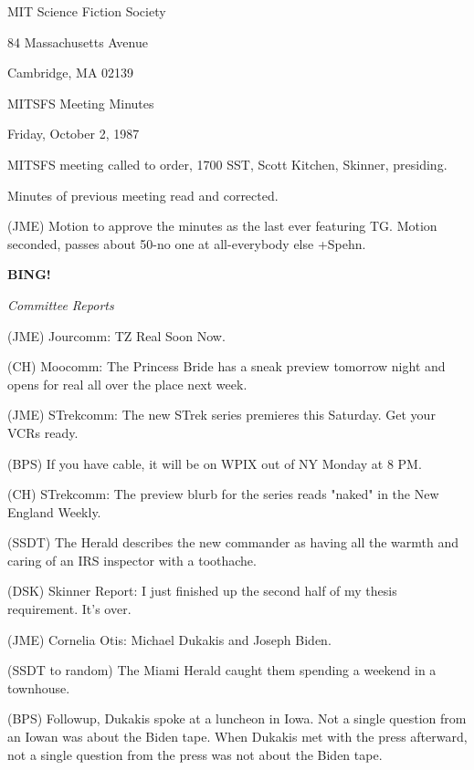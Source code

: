\documentclass[12pt]{article}
\newcommand{\bing}{{\bf BING!} }
\newcommand{\goto}[1]{\bing \vskip 12pt \centerline{{\em{#1}}}}
\begin{document}
\begin{center}

MIT Science Fiction Society 

84 Massachusetts Avenue

Cambridge, MA 02139

\vspace{12pt}

MITSFS Meeting Minutes 

Friday, October 2, 1987

\end{center}
 
\vspace{18pt}

\setlength{\parskip}{6pt}

\noindent
MITSFS meeting called to order, 1700 SST,
Scott Kitchen, Skinner, presiding.

Minutes of previous meeting read and corrected.

(JME) Motion to approve the minutes as the last ever featuring TG. Motion seconded, passes about 50-no one at all-everybody else +Spehn.

\goto{Committee Reports}

(JME) Jourcomm: TZ Real Soon Now.

(CH) Moocomm: The Princess Bride has a sneak preview tomorrow night and opens for real all over the place next week.

(JME) STrekcomm: The new STrek series premieres this Saturday. Get your VCRs ready.

(BPS) If you have cable, it will be on WPIX out of NY Monday at 8 PM.

(CH) STrekcomm: The preview blurb for the series reads "naked" in the New England Weekly.

(SSDT) The Herald describes the new commander as having all the warmth and caring of an IRS inspector with a toothache.

(DSK) Skinner Report: I just finished up the second half of my thesis requirement. It's over.

(JME) Cornelia Otis: Michael Dukakis and Joseph Biden.

(SSDT to random) The Miami Herald caught them spending a weekend in a townhouse.

(BPS) Followup, Dukakis spoke at a luncheon in Iowa. Not a single question from an Iowan was about the Biden tape. When Dukakis met with the press afterward, not a single question from the press was not about the Biden tape.
\end{document}
